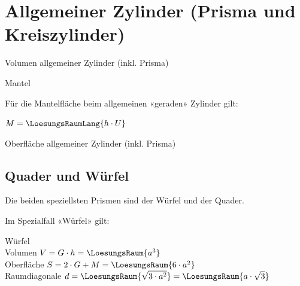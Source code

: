 \section{Allgemeiner Zylinder (Prisma und Kreiszylinder)}


\begin{gesetz}{Volumen allgemeiner Zylinder (inkl. Prisma)}{}

  \begin{center}\end{center}
\end{gesetz}



\begin{bemerkung}{Mantel}{}
  
  Für die Mantelfläche beim allgemeinen «geraden» Zylinder gilt:

  $M = \LoesungsRaumLang{h \cdot U}$
\end{bemerkung}



\begin{gesetz}{Oberfläche allgemeiner Zylinder (inkl. Prisma)}{}

  \begin{center}\end{center}
  \begin{center}\end{center}
\end{gesetz}


\newpage
\subsection{Quader und Würfel}\label{QuaderUndWuerfel}
Die beiden speziellsten Prismen sind der Würfel und der Quader.

Im Spezialfall «Würfel» gilt:
\begin{gesetz}{Würfel}{}\\
  Volumen $V = G\cdot{} h = \LoesungsRaum{a^3}$\\
  Oberfläche $S=2\cdot{}G + M = \LoesungsRaum{6\cdot{}a^2}$\\
  Raumdiagonale $d = \LoesungsRaum{\sqrt{3\cdot{}a^2}} = \LoesungsRaum{a\cdot{}\sqrt{3}}$
\end{gesetz}

